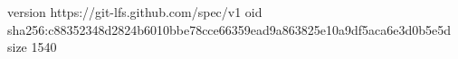 version https://git-lfs.github.com/spec/v1
oid sha256:c88352348d2824b6010bbe78cce66359ead9a863825e10a9df5aca6e3d0b5e5d
size 1540
